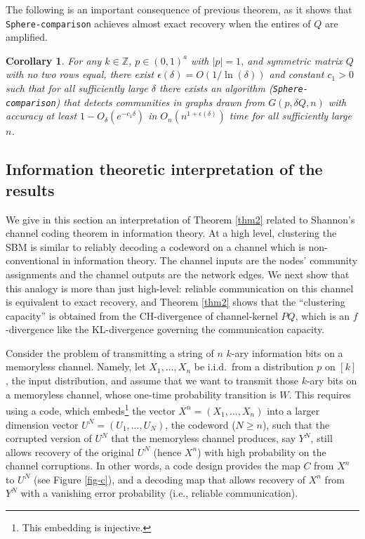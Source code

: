 \documentclass[11pt]{article}
\newcommand{\1}{\mathbb{1}}
\newtheorem{corollary}{Corollary}
\begin{document}
The following is an important consequence of previous theorem, as it shows that {\tt Sphere-comparison} achieves almost exact recovery when the entires of $Q$ are amplified. 
\begin{corollary}
For any $k\in \mathbb{Z}$, $p\in (0,1)^a$ with $|p|=1$, and symmetric  matrix $Q$ with no two rows equal, there exist $\epsilon(\delta)=O(1/\ln(\delta))$ and constant $c_1>0$ such that for all sufficiently large $\delta$ there exists an algorithm ({\tt Sphere-comparison}) that detects communities in graphs drawn from $G(p,\delta Q,n)$ with accuracy at least $1-O_\delta(e^{-c_1\delta})$ in $O_n(n^{1+\epsilon(\delta)})$ time for all sufficiently large $n$.
\end{corollary}




\subsection{Information theoretic interpretation of the results}\label{it-inter}
We give in this section an interpretation of Theorem \ref{thm2} related to Shannon's channel coding theorem in information theory. At a high level, clustering the SBM is similar to reliably decoding a codeword on a channel which is non-conventional in information theory. The channel inputs are the nodes' community assignments and the channel outputs are the network edges. 
We next show that this analogy is more than just high-level: reliable communication on this channel is equivalent to exact recovery, and Theorem \ref{thm2} shows that the ``clustering capacity'' is obtained from the CH-divergence of channel-kernel $PQ$, which is an $f$-divergence like the KL-divergence governing the communication capacity.

Consider the problem of transmitting a string of $n$ $k$-ary information bits on a memoryless channel. Namely, let $X_1,\dots,X_n$ be i.i.d.\ from a distribution $p$ on $[k]$, the input distribution, and assume that we want to transmit those $k$-ary bits on a memoryless channel, whose one-time probability transition is $W$. This requires using a code, which embeds\footnote{This embedding is injective.} the vector $X^n=(X_1,\dots,X_n)$ into a larger dimension vector $U^N=(U_1,\dots,U_N)$, the codeword ($N \geq n$), such that the corrupted version of $U^N$ that the memoryless channel produces, say $Y^N$, still allows recovery of the original $U^N$ (hence $X^n$) with high probability on the channel corruptions. In other words, a code design provides the map $C$ from $X^n$ to $U^N$ (see Figure \ref{fig-c}), and a decoding map that allows recovery of $X^n$ from $Y^N$ with a vanishing error probability (i.e., reliable communication). 
\end{document}
